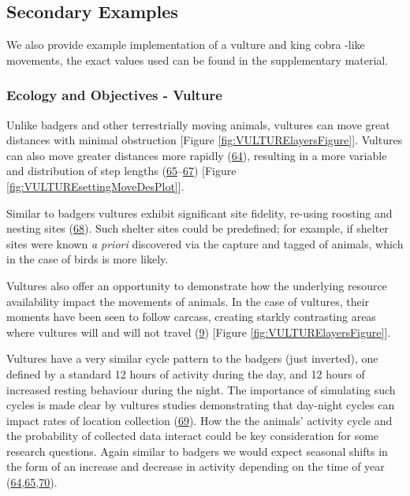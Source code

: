 \documentclass[10pt,a4paper]{article}
\begin{document}
\hypertarget{secondary-examples}{%
\subsection{Secondary Examples}\label{secondary-examples}}

We also provide example implementation of a vulture and king cobra -like movements, the exact values used can be found in the supplementary material.

\hypertarget{ecology-and-objectives---vulture}{%
\subsubsection{Ecology and Objectives - Vulture}\label{ecology-and-objectives---vulture}}

Unlike badgers and other terrestrially moving animals, vultures can move great distances with minimal obstruction {[}Figure \ref{fig:VULTURElayersFigure}{]}.
Vultures can also move greater distances more rapidly (\protect\hyperlink{ref-hribsek_first_2021}{64}), resulting in a more variable and distribution of step lengths (\protect\hyperlink{ref-garcia-jimenez_drivers_2018}{65}--\protect\hyperlink{ref-subedi_spatial_2020}{67}) {[}Figure \ref{fig:VULTUREsettingMoveDesPlot}{]}.

Similar to badgers vultures exhibit significant site fidelity, re-using roosting and nesting sites (\protect\hyperlink{ref-bracis_revisitation_2018}{68}).
Such shelter sites could be predefined; for example, if shelter sites were known \emph{a priori} discovered via the capture and tagged of animals, which in the case of birds is more likely.

Vultures also offer an opportunity to demonstrate how the underlying resource availability impact the movements of animals.
In the case of vultures, their moments have been seen to follow carcass, creating starkly contrasting areas where vultures will and will not travel (\protect\hyperlink{ref-arrondo_invisible_2018}{9}) {[}Figure \ref{fig:VULTURElayersFigure}{]}.

Vultures have a very similar cycle pattern to the badgers (just inverted), one defined by a standard 12 hours of activity during the day, and 12 hours of increased resting behaviour during the night.
The importance of simulating such cycles is made clear by vultures studies demonstrating that day-night cycles can impact rates of location collection (\protect\hyperlink{ref-silva_seasonal_2017}{69}).
How the the animals' activity cycle and the probability of collected data interact could be key consideration for some research questions.
Again similar to badgers we would expect seasonal shifts in the form of an increase and decrease in activity depending on the time of year (\protect\hyperlink{ref-hribsek_first_2021}{64},\protect\hyperlink{ref-garcia-jimenez_drivers_2018}{65},\protect\hyperlink{ref-peshev_new_2021}{70}).
\end{document}

